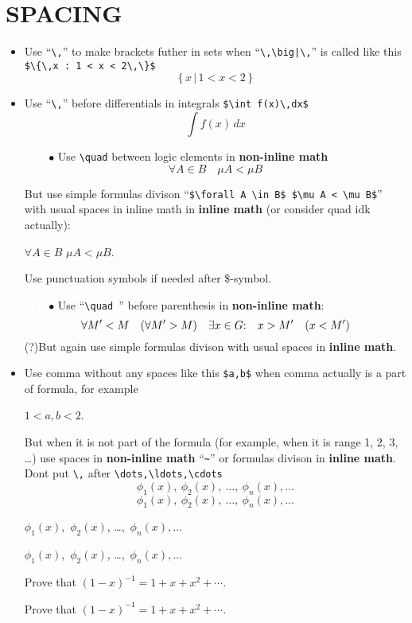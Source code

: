 \documentclass[a5paper,openany,9pt]{extbook}
\begin{document}
\section{SPACING}

\begin{itemize}
\item
Use ``\verb=\,='' to make brackets futher in sets when ``\verb=\,\big|\,='' is called like this \verb|$\{\,x : 1 < x < 2\,\}$|
$$\{\,x \,\big|\, 1 < x < 2\,\}$$
\item
Use ``\verb=\,='' before differentials in integrals \verb=$\int f(x)\,dx$=
$$ \int f(x)\, dx$$
\item[\colorbox{prpl}{\textcolor{white}{MY}}\ $\bullet$]
Use \verb|\quad| between logic elements in \textbf{non-inline math}
$$
\forall A \in B \quad \mu A < \mu B 
$$

But use simple formulas divison ``\verb=$\forall A \in B$ $\mu A < \mu B$='' with usual spaces in inline math in \textbf{inline math} (or consider quad idk actually): 
\begin{center}
$\forall A \in B$ $\mu A < \mu B$.
\end{center}
Use punctuation symbols if needed after \$-symbol.
\item[\colorbox{prpl}{\textcolor{white}{MY}}\ $\bullet$]
Use ``\verb|\quad |'' before parenthesis in \textbf{non-inline math}:
$$
\forall M' < M \quad (\forall M' > M)\quad \exists x\in G{:}\quad x>M' \quad (x<M')
$$
(?)But again use simple formulas divison with usual spaces in \textbf{inline math}.

\item 
Use comma without any spaces like this \verb|$a,b$| when comma actually is a part of formula, for example
\begin{center}
$1<a,b<2$. 
\end{center}
But when it is not part of the formula (for example, when it is range 1, 2, 3, \dots) use spaces in \textbf{non-inline math} ``\verb|~|'' or formulas divison in \textbf{inline math}. Dont put \verb|\,| after \verb|\dots,\ldots,\cdots|
$$
\phi_1(x), \ \phi_2(x),\ \ldots,\ \phi_n(x), \ldots
$$
$$
\phi_1(x), \ \phi_2(x),\ \dots,\ \phi_n(x), \ldots
$$

$\phi_1(x)$,~$\phi_2(x)$, \ldots,~$\phi_n(x), \ldots$

$\phi_1(x)$,~$\phi_2(x)$, \dots,~$\phi_n(x), \ldots$

Prove that $(1-x)^{-1}=1+x+x^2+\cdots$.

Prove that $(1-x)^{-1}=1+x+x^2+\cdots$.


\end{itemize}
\end{document}
